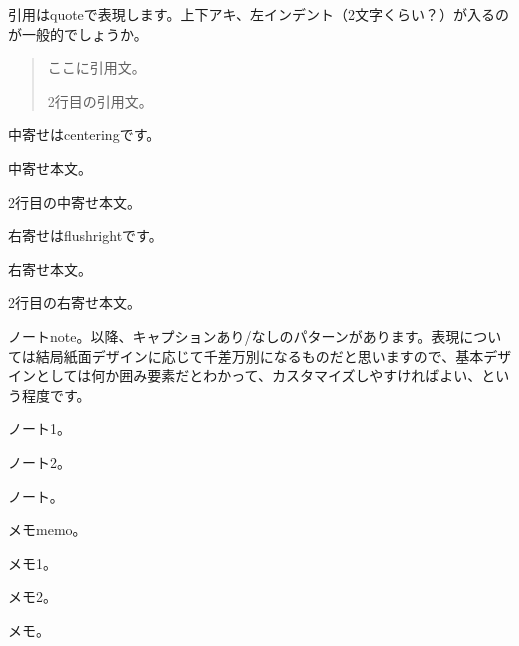 引用はquoteで表現します。上下アキ、左インデント（2文字くらい？）が入るのが一般的でしょうか。

\begin{quote}
ここに引用文。

2行目の引用文。
\end{quote}

中寄せはcenteringです。

\begin{flushright}
中寄せ本文。

2行目の中寄せ本文。
\end{flushright}

右寄せはflushrightです。

\begin{flushright}
右寄せ本文。

2行目の右寄せ本文。
\end{flushright}

ノートnote。以降、キャプションあり/なしのパターンがあります。表現については結局紙面デザインに応じて千差万別になるものだと思いますので、基本デザインとしては何か囲み要素だとわかって、カスタマイズしやすければよい、という程度です。

\begin{reviewnote}

ノート1。

ノート2。

\end{reviewnote}
\begin{reviewnote}

ノート。

\end{reviewnote}

メモmemo。

\begin{reviewmemo}

メモ1。

メモ2。

\end{reviewmemo}
\begin{reviewmemo}

メモ。

\end{reviewmemo}

